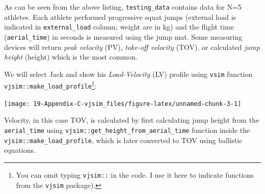 \documentclass[
]{book}
\newenvironment{Shaded}{\begin{snugshade}}{\end{snugshade}}
\newcommand{\CommentTok}[1]{\textcolor[rgb]{0.56,0.35,0.01}{\textit{#1}}}
\newcommand{\DataTypeTok}[1]{\textcolor[rgb]{0.13,0.29,0.53}{#1}}
\newcommand{\KeywordTok}[1]{\textcolor[rgb]{0.13,0.29,0.53}{\textbf{#1}}}
\newcommand{\NormalTok}[1]{#1}
\newcommand{\OperatorTok}[1]{\textcolor[rgb]{0.81,0.36,0.00}{\textbf{#1}}}
\newcommand{\OtherTok}[1]{\textcolor[rgb]{0.56,0.35,0.01}{#1}}
\newcommand{\StringTok}[1]{\textcolor[rgb]{0.31,0.60,0.02}{#1}}
\begin{document}
As can be seen from the above listing, \texttt{testing\_data} contains data for N=5 athletes. Each athlete performed progressive squat jumps (external load is indicated in \texttt{external\_load} column; weight are in kg) and the flight time (\texttt{aerial\_time}) in seconds is measured using the jump mat. Some measuring devices will return \emph{peak velocity} (PV), \emph{take-off velocity} (TOV), or calculated \emph{jump height} (height) which is the most common.

We will select Jack and show his \emph{Load-Velocity} (LV) profile using \texttt{vsim} function \texttt{vjsim::make\_load\_profile}\footnote{You can omit typing \texttt{vjsim::} in the code. I use it here to indicate functions from the \texttt{vjsim} package).}:

\begin{Shaded}
\end{Shaded}

\begin{center}\texttt{[image: 19-Appendix-C-vjsim\_files/figure-latex/unnamed-chunk-3-1]} \end{center}

Velocity, in this case TOV, is calculated by first calculating jump height from the \texttt{aerial\_time} using \texttt{vjsim::get\_height\_from\_aerial\_time} function inside the \texttt{vjsim::make\_load\_profile}, which is later converted to TOV using ballistic equations.
\end{document}
